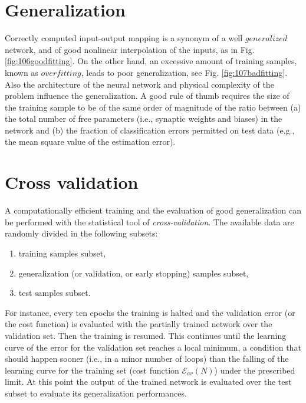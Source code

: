 \section{Generalization}
\label{sec:generalization}



Correctly computed input-output mapping is a synonym of a well $generalized$
network, and of good nonlinear interpolation of the inputs, as in Fig. 
\ref{fig:106goodfitting}. On the other hand, an excessive amount of
training samples, known as $overfitting$, leads to poor generalization, see 
Fig. \ref{fig:107badfitting}. Also the architecture of the neural network and
physical complexity of the problem influence the generalization.
A good rule of thumb requires the size of the training sample to be of the same
order of magnitude of the ratio between (a) the total number of free parameters 
(i.e., synaptic weights and biases) in the
network and (b) the fraction of classification errors permitted on test
data (e.g., the mean square value of the estimation error).

\section{Cross validation}
\label{sec:crossvalidation}

A computationally efficient training and the evaluation of good generalization
can be performed with the statistical tool of \textit{cross-validation}.
The available data are randomly divided in the following subsets:

\begin{enumerate}
  \item{training samples subset,}
  \item{generalization (or validation, or early stopping) samples subset,}
  \item{test samples subset.}
\end{enumerate}

For instance, every ten epochs the training is halted and the validation error
(or the cost function) is evaluated with the partially trained network over the
validation set.
Then the training is resumed.
This continues until the learning curve of the error for the validation set
reaches a local minimum, a condition that should happen sooner (i.e., in a
minor number of loops) than the falling of the learning curve for the training
set (cost function $\mathscr{E}_{av}(N)$) under the prescribed limit.
At this point the output of the trained network is evaluated over the test
subset to evaluate its generalization performances.

